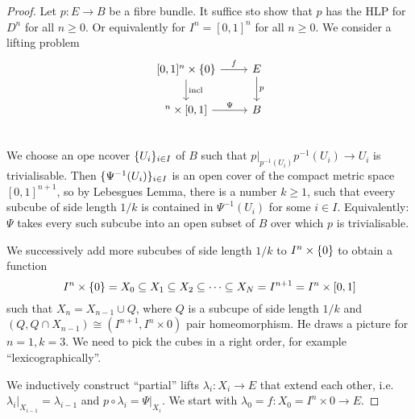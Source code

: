 \documentclass[language=english]{TemplateLecture}
\begin{document}
\begin{proof}
    Let \(p \colon E \to B\) be a fibre bundle. It suffice sto show that \(p\) has the HLP for \(D^n\) for all \(n \geq 0\). Or equivalently for \(I^n = [0,1]^n\) for all \(n \geq 0\). We consider a lifting problem
    \[\begin{tikzcd}
        {[0,1]^n \times \set 0} \ar[r, "f"] \ar[d, "\incl"] & E \ar[d, "p"] \\
        [0,1]^n \times [0,1] \ar[r, "\Psi"] & B \\
    \end{tikzcd}\]
    We choose an ope ncover \(\{U_i\}_{i \in I}\) of \(B\) such that \(p\rvert_{p^{-1}(U_i)} p^{-1}(U_i) \to U_i\) is trivialisable. Then \(\{\Psi^{-1}(U_i)\}_{i \in I}\) is an open cover of the compact metric space \([0,1]^{n+1}\), so by Lebesgues Lemma, there is a number \(k \geq 1\), such that eveery subcube of side length \(1/k\) is contained in \(\Psi^{-1}(U_i)\) for some \(i \in I\). Equivalently: \(\Psi\) takes every such subcube into an open subset of \(B\) over which \(p\) is trivialisable.

    We successively add more subcubes of side length \(1/k\) to \(I^n \times \{0\}\) to obtain a function
    \[I^n \times \{0\} = X_0 \subseteq X_1 \subseteq X_2 \subseteq \dots \subseteq X_N = I^{n+1} = I^n \times[0,1]\]
    such that \(X_n = X_{n-1} \cup Q\), where \(Q\) is a subcupe of side length \(1/k\) and \((Q, Q\cap X_{n-1}) \cong (I^{n+1}, I^n \times 0)\) pair homeomorphism. He draws a picture for \(n = 1, k = 3\). We need to pick the cubes in a right order, for example \enquote{lexicographically}.

    We inductively construct \enquote{partial} lifts \(\lambda_i\colon X_i \to E\) that extend each other, i.e. \(\lambda_i\rvert_{X_{i-1}} = \lambda_{i-1}\) and \(p\circ \lambda_i = \Psi\rvert_{X_i}\). We start with \(\lambda_0 = f\colon X_0 = I^n \times 0 \to E\).


\end{proof}
\end{document}

